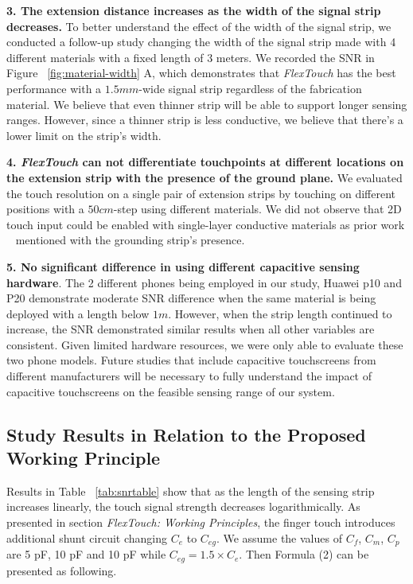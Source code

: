 \textbf{3. The extension distance increases as the width of the signal strip decreases.} To better understand the effect of the width of the signal strip, we conducted a follow-up study changing the width of the signal strip made with 4 different materials with a fixed length of 3 meters. We recorded the SNR in Figure ~\ref{fig:material-width} A, which demonstrates that \textit{FlexTouch} has the best performance with a $1.5mm$-wide signal strip regardless of the fabrication material. We believe that even thinner strip will be able to support longer sensing ranges. However, since a thinner strip is less conductive, we believe that there's a lower limit on the strip's width.


\textbf{4. \textbf{\textit{FlexTouch}} can not differentiate touchpoints at different locations on the extension strip with the presence of the ground plane.} We evaluated the touch resolution on a single pair of extension strips by touching on different positions with a $50 cm$-step using different materials. We did not observe that 2D touch input could be enabled with single-layer conductive materials as prior work ~\cite{Ikematsu-Ohmic-Touch, mobicom-gao18} mentioned with the grounding strip's presence.

\textbf{5. No significant difference in using different capacitive sensing hardware}. The 2 different phones being employed in our study, Huawei p10 and P20 demonstrate moderate SNR difference when the same material is being deployed with a length below $1m$. However, when the strip length continued to increase, the SNR demonstrated similar results when all other variables are consistent. Given limited hardware resources, we were only able to evaluate these two phone models. Future studies that include capacitive touchscreens from different manufacturers will be necessary to fully understand the impact of capacitive touchscreens on the feasible sensing range of our system.

\subsection{Study Results in Relation to the Proposed Working Principle}
 
Results in Table ~\ref{tab:snrtable} show that as the length of the sensing strip increases linearly, the touch signal strength decreases logarithmically. As presented in section \textit{FlexTouch: Working Principles}, the finger touch introduces additional shunt circuit changing $C_{e}$ to $C_{eg}$. We assume the values of $C_{f}$, $C_{m}$, $C_{p}$ are 5 pF, 10 pF and 10 pF while $C_{eg} = 1.5 \times C_{e}$. Then Formula (2) can be presented as following.

